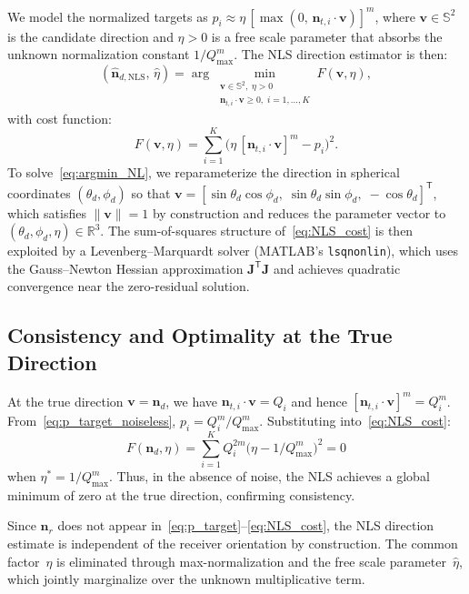 \documentclass[journal]{IEEEtran}
\begin{document}
We model the normalized targets as $p_i \approx \eta\,[\max(0,\,\mathbf{n}_{t,i}\cdot\mathbf{v})]^m$, where $\mathbf{v}\in\mathbb{S}^2$ is the candidate direction and $\eta>0$ is a free scale parameter that absorbs the unknown normalization constant $1/Q_{\max}^m$. The NLS direction estimator is then:
\begin{equation}
(\hat{\mathbf{n}}_{d,\mathrm{NLS}},\,\hat\eta) = \arg\min_{\substack{\mathbf{v}\in\mathbb{S}^2,\;\eta>0 \\ \mathbf{n}_{t,i}\cdot\mathbf{v}\ge0,\;i=1,\ldots,K}} F(\mathbf{v},\eta),
\label{eq:argmin_NL}
\end{equation}
with cost function:
\begin{equation}
F(\mathbf{v},\eta) = \sum_{i=1}^{K}\bigl(\eta\,[\mathbf{n}_{t,i}\cdot\mathbf{v}]^m - p_i\bigr)^2.
\label{eq:NLS_cost}
\end{equation}
To solve~\eqref{eq:argmin_NL}, we reparameterize the direction in spherical coordinates $(\theta_d,\phi_d)$ so that $\mathbf{v}=[\sin\theta_d\cos\phi_d,\;\sin\theta_d\sin\phi_d,\;-\cos\theta_d]^{\mathsf T}$, which satisfies $\lVert\mathbf{v}\rVert=1$ by construction and reduces the parameter vector to $(\theta_d,\phi_d,\eta)\in\mathbb{R}^3$. The sum-of-squares structure of~\eqref{eq:NLS_cost} is then exploited by a Levenberg--Marquardt solver (MATLAB's \texttt{lsqnonlin}), which uses the Gauss--Newton Hessian approximation $\mathbf{J}^{\mathsf T}\mathbf{J}$ and achieves quadratic convergence near the zero-residual solution.

\subsection{Consistency and Optimality at the True Direction}
At the true direction $\mathbf{v}=\mathbf{n}_d$, we have $\mathbf{n}_{t,i}\cdot\mathbf{v}=Q_i$ and hence $[\mathbf{n}_{t,i}\cdot\mathbf{v}]^m=Q_i^m$. From~\eqref{eq:p_target_noiseless}, $p_i=Q_i^m/Q_{\max}^m$. Substituting into~\eqref{eq:NLS_cost}:
\begin{equation}
F(\mathbf{n}_d,\eta)=\sum_{i=1}^K Q_i^{2m}\bigl(\eta - 1/Q_{\max}^m\bigr)^2 = 0
\end{equation}
when $\eta^*=1/Q_{\max}^m$. Thus, in the absence of noise, the NLS achieves a global minimum of zero at the true direction, confirming consistency.

Since $\mathbf{n}_r$ does not appear in~\eqref{eq:p_target}--\eqref{eq:NLS_cost}, the NLS direction estimate is independent of the receiver orientation by construction. The common factor~$\eta$ is eliminated through max-normalization and the free scale parameter~$\hat\eta$, which jointly marginalize over the unknown multiplicative term.
\end{document}
